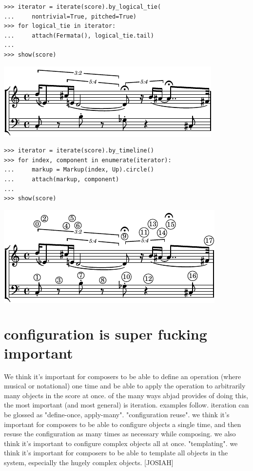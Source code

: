 \documentclass{article}
\begin{document}
\begin{lstlisting}
>>> iterator = iterate(score).by_logical_tie(
...     nontrivial=True, pitched=True)
>>> for logical_tie in iterator:
...     attach(Fermata(), logical_tie.tail)
... 
>>> show(score)
\end{lstlisting}

\includegraphics[scale=1.0]{images/abjad-6.pdf}


\begin{lstlisting}
>>> iterator = iterate(score).by_timeline()
>>> for index, component in enumerate(iterator):
...     markup = Markup(index, Up).circle()
...     attach(markup, component)
... 
>>> show(score)
\end{lstlisting}

\includegraphics[scale=1.0]{images/abjad-7.pdf}


\section{configuration is super fucking important}

We think it's important for composers to be able to define an operation (where
musical or notational) one time and be able to apply the operation to
arbitrarily many objects in the score at once. of the many ways abjad provides
of doing this, the most important (and most general) is iteration. examples
follow. iteration can be glossed as "define-once, apply-many". "configuration
reuse". we think it's important for composers to be able to configure objects a
single time, and then resuse the configuration as many times as necessary while
composing. we also think it's important to configure complex objects all at
once. "templating". we think it's important for composers to be able to
template all objects in the system, especially the hugely complex objects.
[JOSIAH]
\end{document}
